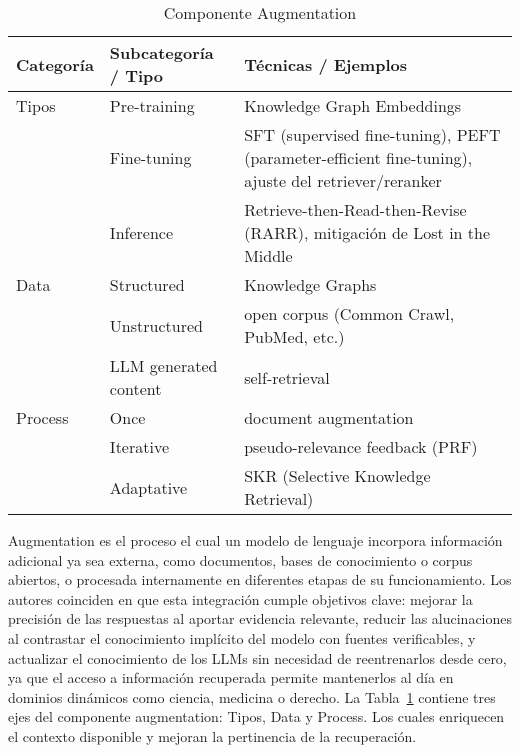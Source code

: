 \begin{table}[H]
\centering
\begin{tabularx}{\textwidth}{l l >{\raggedright\arraybackslash}X}
\toprule
\textbf{Categoría} & \textbf{Subcategoría / Tipo} & \textbf{Técnicas / Ejemplos} \\
\midrule
Tipos   & Pre-training          & Knowledge Graph Embeddings \\
        & Fine-tuning           & SFT (supervised fine-tuning), PEFT (parameter-efficient fine-tuning), ajuste del retriever/reranker  \\
        & Inference             & Retrieve-then-Read-then-Revise (RARR), mitigación de Lost in the Middle  \\
\midrule
Data    & Structured            & Knowledge Graphs \\
        & Unstructured          & open corpus (Common Crawl, PubMed, etc.) \\
        & LLM generated content & self-retrieval \\
\midrule
Process & Once                  & document augmentation \\
        & Iterative             & pseudo-relevance feedback (PRF) \\
        & Adaptative            & SKR (Selective Knowledge Retrieval)\\
\bottomrule
\end{tabularx}
\caption{Componente Augmentation}
\label{tab:augmentation}
\end{table}

Augmentation es el proceso el cual un modelo de lenguaje incorpora información adicional 
ya sea externa, como documentos, bases de conocimiento o corpus abiertos, o procesada internamente en diferentes etapas de su funcionamiento.
Los autores coinciden en que esta integración cumple objetivos clave: mejorar la precisión de las respuestas al aportar evidencia relevante, 
reducir las alucinaciones al contrastar el conocimiento implícito del modelo con fuentes verificables, y actualizar el conocimiento de los LLMs sin 
necesidad de reentrenarlos desde cero, ya que el acceso a información recuperada permite mantenerlos al día en dominios dinámicos como ciencia, medicina o derecho.
La Tabla~\ref{tab:augmentation} contiene tres ejes del componente augmentation: Tipos, Data y Process. Los cuales enriquecen el contexto disponible y mejoran la pertinencia
de la recuperación.


